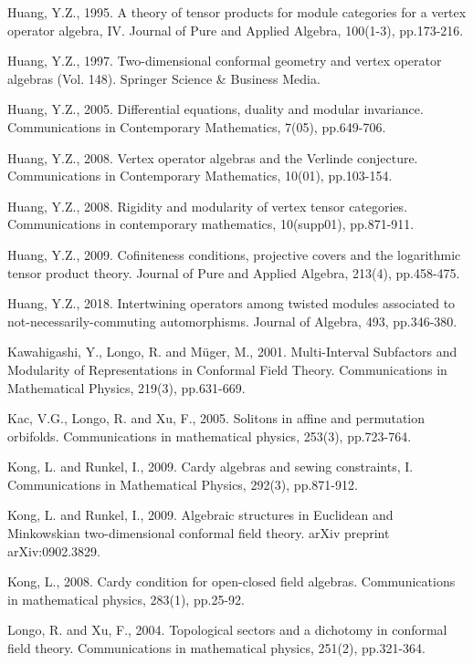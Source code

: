 \documentclass[11pt,b5paper,notitlepage]{article}
\theoremstyle{definition}
\theoremstyle{plain}
\numberwithin{equation}{subsection}
\begin{document}
\begin{thebibliography}{999999}
Huang, Y.Z., 1995. A theory of tensor products for module categories for a vertex operator algebra, IV. Journal of Pure and Applied Algebra, 100(1-3), pp.173-216.

Huang, Y.Z., 1997. Two-dimensional conformal geometry and vertex operator algebras (Vol. 148). Springer Science \& Business Media.

Huang, Y.Z., 2005. Differential equations, duality and modular invariance. Communications in Contemporary Mathematics, 7(05), pp.649-706.


Huang, Y.Z., 2008. Vertex operator algebras and the Verlinde conjecture. Communications in Contemporary Mathematics, 10(01), pp.103-154.

Huang, Y.Z., 2008. Rigidity and modularity of vertex tensor categories. Communications in contemporary mathematics, 10(supp01), pp.871-911.

Huang, Y.Z., 2009. Cofiniteness conditions, projective covers and the logarithmic tensor product theory. Journal of Pure and Applied Algebra, 213(4), pp.458-475.



Huang, Y.Z., 2018. Intertwining operators among twisted modules associated to not-necessarily-commuting automorphisms. Journal of Algebra, 493, pp.346-380.

Kawahigashi, Y., Longo, R. and Müger, M., 2001. Multi-Interval Subfactors and Modularity of Representations in Conformal Field Theory. Communications in Mathematical Physics, 219(3), pp.631-669.

Kac, V.G., Longo, R. and Xu, F., 2005. Solitons in affine and permutation orbifolds. Communications in mathematical physics, 253(3), pp.723-764.

Kong, L. and Runkel, I., 2009. Cardy algebras and sewing constraints, I. Communications in Mathematical Physics, 292(3), pp.871-912.

Kong, L. and Runkel, I., 2009. Algebraic structures in Euclidean and Minkowskian two-dimensional conformal field theory. arXiv preprint arXiv:0902.3829.


Kong, L., 2008. Cardy condition for open-closed field algebras. Communications in mathematical physics, 283(1), pp.25-92.


Longo, R. and Xu, F., 2004. Topological sectors and a dichotomy in conformal field theory. Communications in mathematical physics, 251(2), pp.321-364.	


\end{thebibliography}
\end{document}
